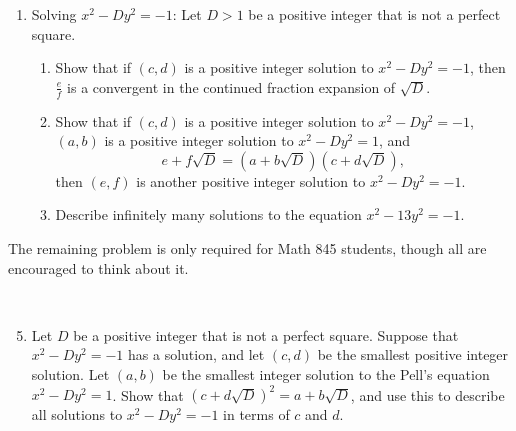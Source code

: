 \documentclass{amsart}
\begin{document}
\begin{enumerate}
\

\item Solving $x^2 - D y^2 = -1$: Let $D>1$ be a positive integer that is not a perfect square.
\begin{enumerate}
\item Show that if $(c,d)$ is a positive integer solution to $x^2 - D y^2 = -1$, then $\frac{e}{f}$ is a convergent in the continued fraction expansion of $\sqrt{D}$.
\item Show that if $(c,d)$ is a positive integer solution to $x^2 - D y^2 = -1$, $(a,b)$ is a positive integer solution to $x^2 - D y^2 = 1$, and
\[ e + f\sqrt{D} = (a+b\sqrt{D})(c+d\sqrt{D}),\]
then $(e,f)$ is another positive integer solution to $x^2 - D y^2 = -1$.
\item Describe infinitely many solutions to the equation $x^2 - 13y^2 = -1$.
\end{enumerate}




\end{enumerate}

\noindent  \hrulefill

\noindent The remaining problem is only required for Math 845 students, though all are encouraged to think about it.

\

\begin{enumerate}\setcounter{enumi}{4}
\item Let $D$ be a positive integer that is not a perfect square. Suppose that $x^2 - D y^2 = -1$ has a solution, and let $(c,d)$ be the smallest positive integer solution. Let $(a,b)$ be the smallest integer solution to the Pell's equation $x^2 - D y^2 = 1$. Show that $(c+d\sqrt{D})^2 = a+b\sqrt{D}$, and use this to describe all solutions to $x^2 - D y^2 = -1$ in terms of $c$ and $d$.
\end{enumerate}
\end{document}
